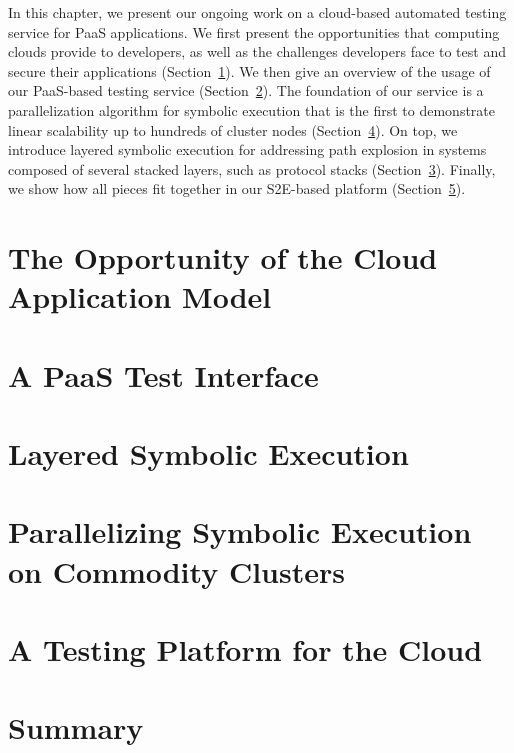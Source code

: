 In this chapter, we present our ongoing work on a cloud-based automated testing service for PaaS applications.
%
We first present the opportunities that computing clouds provide to developers, as well as the challenges developers face to test and secure their applications (Section~\ref{sec:paas:opportunity}).
%
We then give an overview of the usage of our PaaS-based testing service (Section~\ref{sec:paas:abstractions}).
%
The foundation of our service is a parallelization algorithm for symbolic execution that is the first to demonstrate linear scalability up to hundreds of cluster nodes (Section~\ref{sec:paas:parsymbex}).
%
On top, we introduce layered symbolic execution for addressing path explosion in systems composed of several stacked layers, such as protocol stacks (Section~\ref{sec:paas:layeredsymbex}).
%
Finally, we show how all pieces fit together in our S2E-based platform (Section~\ref{sec:paas:fedsymbex}).

\section{The Opportunity of the Cloud Application Model}
\label{sec:paas:opportunity}


\section{A PaaS Test Interface}
\label{sec:paas:abstractions}


\section{Layered Symbolic Execution}
\label{sec:paas:layeredsymbex}


\section{Parallelizing Symbolic Execution on Commodity Clusters}
\label{sec:paas:parsymbex}


\section{A Testing Platform for the Cloud}
\label{sec:paas:fedsymbex}


\section{Summary}


